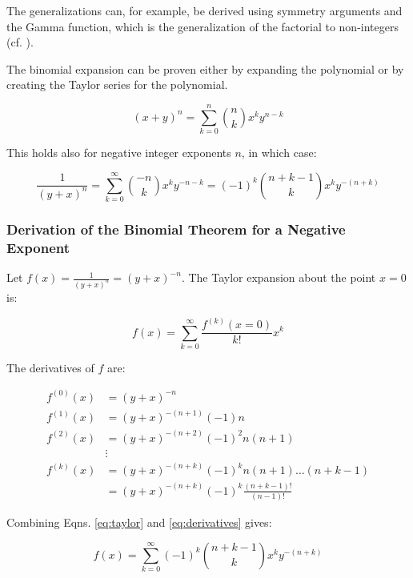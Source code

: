 The generalizations can, for example, be derived using symmetry arguments and the Gamma function, which is the generalization of the factorial to non-integers (cf.  ).


The binomial expansion can be proven either by expanding the polynomial or by creating the Taylor series for the polynomial.

\begin{equation}
(x + y)^n = \sum_{k=0}^n {n \choose k} x^k y^{n-k}
\end{equation}

This holds also for negative integer exponents $n$, in which case:

\begin{equation}
\frac{1}{(y+x)^n} = \sum_{k=0}^\infty {-n \choose k} x^k y^{-n-k} = (-1)^k { n+k-1 \choose k} x^k y^{-(n+k)}
\end{equation}

\subsubsection{Derivation of the Binomial Theorem for a Negative Exponent}

Let $f(x) = \frac{1}{(y+x)^n} = (y+x)^{-n}$. The Taylor expansion about the point $x=0$ is:

\begin{equation}
f(x) = \sum_{k=0}^\infty \frac{f^{(k)}(x=0)}{k!} x^k
\label{eq:taylor}
\end{equation}

The derivatives of $f$ are:

\begin{equation}
\begin{array}{ll}
f^{(0)}(x) &= (y+x)^{-n}\\
f^{(1)}(x) &= (y+x)^{-(n+1)}(-1)n\\
f^{(2)}(x) &= (y+x)^{-(n+2)}(-1)^2 n(n+1)\\
&\vdots\\
f^{(k)}(x) &= (y+x)^{-(n+k)}(-1)^k n(n+1)\hdots	(n+k-1)\\
&=  (y+x)^{-(n+k)}(-1)^k \frac{(n+k-1)!}{(n-1)!}
\end{array}
\label{eq:derivatives}
\end{equation} 

Combining Eqns. \ref{eq:taylor} and \ref{eq:derivatives} gives:

\begin{equation}
f(x) = \sum_{k=0}^\infty (-1)^k {n+k-1 \choose k} x^k y^{-(n+k)}
\end{equation}


